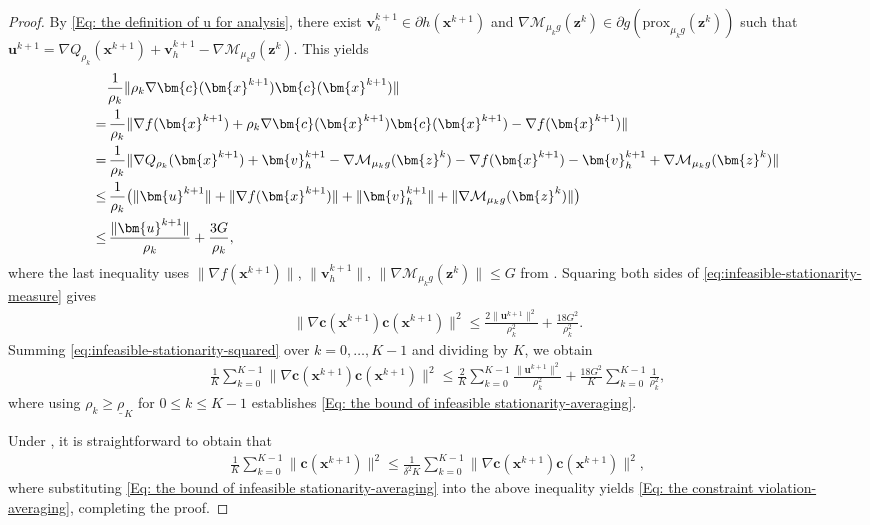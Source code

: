 \documentclass{article}
\theoremstyle{plain}
\theoremstyle{definition}
\theoremstyle{remark}
\newcommand{\prox}{\mathrm{prox}}
\newcommand{\bx}{\bm{x}}
\newcommand{\bc}{\bm{c}}
\newcommand{\bu}{\bm{u}}
\newcommand{\bz}{\bm{z}}
\newcommand{\calM}{\mathcal{M}}
\newcommand{\bv}{\bm{v}}
\newcommand{\sumK}{\sum_{k=0}^{K-1}}
\numberwithin{equation}{section}
\begin{document}
\begin{proof}
By \eqref{Eq: the definition of u for analysis}, there exist $\bv_h^{k+1} \in \partial h(\bx^{k+1})$ and $\nabla \calM_{\mu_k g}(\bz^{k}) \in \partial g(\prox_{\mu_k g}(\bz^k))$ such that
\(
\bu^{k+1} = \nabla Q_{\rho_k}(\bx^{k+1}) + \bv_{h}^{k+1} - \nabla \calM_{\mu_k g}(\bz^{k}).
\)
This yields
\begin{align}
    &\frac{1}{\rho_{k}}\| \rho_{k}\nabla \bc(\bx^{k+1}) \bc(\bx^{k+1}) \| \notag \\
    =&\, \frac{1}{\rho_{k}}\| \nabla f(\bx^{k+1}) + \rho_{k}\nabla \bc(\bx^{k+1}) \bc(\bx^{k+1}) - \nabla f(\bx^{k+1}) \| \notag  \\
    =&\, \frac{1}{\rho_{k}}\| \nabla Q_{\rho_k}(\bx^{k+1}) + \bv_{h}^{k+1}- \nabla \calM_{\mu_k g}(\bz^{k}) - \nabla f(\bx^{k+1}) - \bv_{h}^{k+1}+ \nabla \calM_{\mu_k g}(\bz^{k}) \| \notag \\
    \leq&\, \frac{1}{\rho_{k}}\bigl( \| \bu^{k+1}\| + \| \nabla f(\bx^{k+1}) \| + \| \bv_{h}^{k+1}\| + \| \nabla \calM_{\mu_k g}(\bz^{k}) \| \bigr) \notag \\
    \leq&\, \frac{\| \bu^{k+1}\|}{\rho_{k}}+ \frac{3 G}{\rho_{k}}, \label{eq:infeasible-stationarity-measure}
\end{align}
where the last inequality uses $\| \nabla f(\bx^{k+1}) \|$, $\| \bv_{h}^{k+1}\|$, $\| \nabla \calM_{\mu_k g}(\bz^{k}) \| \leq G$ from .
Squaring both sides of \eqref{eq:infeasible-stationarity-measure}
gives
    \begin{align}
        \| \nabla \bc(\bx^{k+1}) \bc(\bx^{k+1}) \|^{2}\leq \frac{2 \| \bu^{k+1}\|^{2}}{\rho_{k}^{2}}+ \frac{18 G^{2}}{\rho_{k}^{2}}.\label{eq:infeasible-stationarity-squared}
    \end{align}
Summing \eqref{eq:infeasible-stationarity-squared} over $k = 0, \dots, K-1$ and
    dividing by $K$, we obtain
    \begin{align*}
        \frac{1}{K}\sumK \| \nabla \bc(\bx^{k+1}) \bc(\bx^{k+1}) \|^{2}\leq \frac{2}{K}\sumK \frac{\| \bu^{k+1}\|^{2}}{\rho_{k}^{2}}+ \frac{18 G^{2}}{K}\sumK \frac{1}{\rho_{k}^{2}},
    \end{align*}
where using $\rho_{k}\geq \underline{\rho}_K$ for $0\leq k\leq K-1$
    establishes \eqref{Eq: the bound of infeasible stationarity-averaging}.

    Under , it is straightforward to obtain that
    \begin{align*}
        \frac{1}{K}\sumK \| \bc(\bx^{k+1}) \|^{2}\leq \frac{1}{ \delta^{2}K }\sumK \| \nabla \bc(\bx^{k+1}) \bc(\bx^{k+1}) \|^{2},
    \end{align*}
where substituting \eqref{Eq: the bound of infeasible stationarity-averaging}
    into the above inequality yields \eqref{Eq: the constraint violation-averaging},
    completing the proof.
\end{proof}
\end{document}
